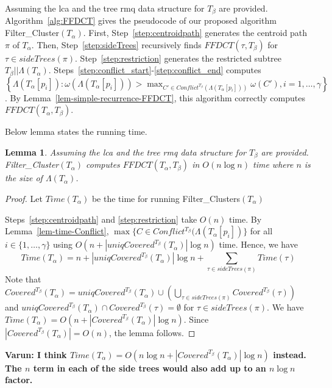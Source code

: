 \documentclass[final,1p,times]{elsarticle}
\newcommand{\weight}{\omega}
\newcommand{\TA}{T_\alpha}
\newcommand{\TB}{T_\beta}
\newtheorem{lemma}[theorem]{Lemma}
\begin{document}
	    Assuming the lca and the tree rmq data structure for $\TB$ are provided.
    Algorithm~\ref{alg:FFDCT} gives the pseudocode of our proposed algorithm Filter\_Cluster$(\TA)$. First, Step~\ref{step:centroidpath} generates the centroid path $\pi$ of $\TA$.
    Then, Step~\ref{step:sideTrees} recursively finds $FFDCT(\tau, \TB)$ for $\tau \in sideTrees(\pi)$.
	    Step~\ref{step:restriction} generates the restricted subtree $\TB||\Lambda(\TA)$.
    Steps~\ref{step:conflict_start}-\ref{step:conflict_end} computes
		 $\left\{ \Lambda(\TA[p_i]) : \weight(\Lambda(\TA[p_i])) > \max_{C' \in Conflict^{\TB}(\Lambda(\TA[p_i]))} \weight(C'), i=1,\ldots, \gamma \right\}$.
	    	By Lemma~\ref{lem-simple-recurrence-FFDCT}, this algorithm correctly computes $FFDCT(\TA, \TB)$.

    Below lemma states the running time.
    \begin{lemma}
	    Assuming the lca and the tree rmq data structure for $\TB$ are provided.
	    Filter\_Cluster$(\TA)$ computes $FFDCT(\TA, \TB)$ in $O(n \log n)$ time where $n$ is the size of $\Lambda(\TA)$.
    \end{lemma}
    \begin{proof}
	    Let $Time(\TA)$ be the time for running Filter\_Clusters$(\TA)$

	    Steps~\ref{step:centroidpath} and \ref{step:restriction} take $O(n)$ time.
	    By Lemma~\ref{lem-time-Conflict},
	    $\max \{ C \in Conflict^{\TB}(\Lambda(\TA[p_i]) \}$ for all $i \in \{1, \ldots, \gamma\}$
	    using $O\left(n + |uniqCovered^{\TB}(\TA)| \log n \right)$ time.
	    Hence, we have
	    \[ Time(\TA) = n + |uniqCovered^{\TB}(\TA)| \log n + \sum_{\tau \in sideTrees(\pi)} Time(\tau) \]
	    Note that $Covered^{\TB}(\TA) = uniqCovered^{\TB}(\TA) \cup \left( \bigcup_{\tau \in sideTrees(\pi)} Covered^{\TB}(\tau) \right)$ and $uniqCovered^{\TB}(\TA) \cap Covered^{\TB}(\tau) = \emptyset$ for $\tau \in sideTrees(\pi)$.
	    We have $Time(\TA) = O(n + |Covered^{\TB}(\TA)| \log n)$.
	    Since $|Covered^{\TB}(\TA)| = O(n)$, the lemma follows.
    \end{proof}

	{\bf Varun: I think $Time(\TA) = O(n \log n + |Covered^{\TB}(\TA)| \log n)$ instead. The $n$ term in each of the side trees would also add up to an $n \log n$ factor.}
\end{document}
